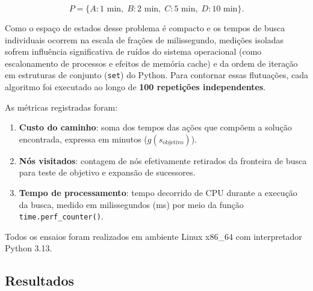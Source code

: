 \documentclass[12pt,a4paper]{article}
\begin{document}
\[
P = \{A: 1\text{ min},\; B: 2\text{ min},\; C: 5\text{ min},\; D: 10\text{ min}\}.
\]

Como o espaço de estados desse problema é compacto e os tempos de busca individuais 
ocorrem na escala de frações de milissegundo, medições isoladas sofrem influência 
significativa de ruídos do sistema operacional (como escalonamento de processos e 
efeitos de memória cache) e da ordem de iteração em estruturas de conjunto 
(\texttt{set}) do Python. Para contornar essas flutuações, cada algoritmo foi executado 
ao longo de \textbf{100 repetições independentes}.

As métricas registradas foram:
\begin{enumerate}
    \item \textbf{Custo do caminho}: soma dos tempos das ações que compõem a solução encontrada, expressa em minutos ($g(s_{\text{objetivo}})$).
    \item \textbf{Nós visitados}: contagem de nós efetivamente retirados da fronteira de busca para teste de objetivo e expansão de sucessores.
    \item \textbf{Tempo de processamento}: tempo decorrido de CPU durante a execução da busca, medido em milissegundos (ms) por meio da função \texttt{time.perf\_counter()}.
\end{enumerate}

Todos os ensaios foram realizados em ambiente Linux x86\_64 com interpretador Python 3.13.

\subsection{Resultados}
\label{subsec:resultados}
%
%
\end{document}
